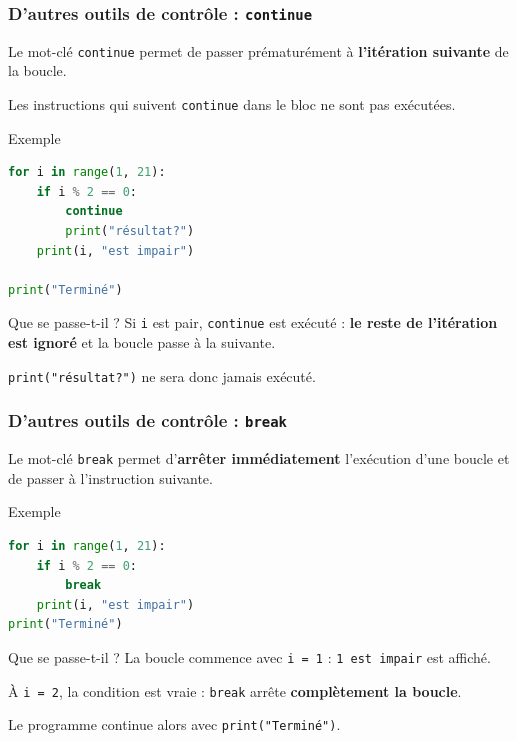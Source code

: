\documentclass[10pt]{beamer}
\begin{document}
\begin{frame}[containsverbatim]
	\frametitle{D'autres outils de contrôle : \texttt{continue}}
	

		Le mot-clé \texttt{continue} permet de passer prématurément
		à \textbf{l'itération suivante} de la boucle.
		
		Les instructions qui suivent \texttt{continue} dans le bloc
		ne sont pas exécutées.

	

	
	\begin{exampleblock}{Exemple}
\begin{lstlisting}[language=Python]
for i in range(1, 21):
	if i % 2 == 0:
		continue
		print("résultat?")
	print(i, "est impair")

print("Terminé")
		\end{lstlisting}
	\end{exampleblock}
	

	
	\begin{block}{Que se passe-t-il ?}
		Si \texttt{i} est pair, \texttt{continue} est exécuté :
		\textbf{le reste de l'itération est ignoré} et la boucle passe à la suivante.
		
		\centering
		\texttt{print("résultat?")} ne sera donc jamais exécuté.
	\end{block}
	
\end{frame}



\begin{frame}[containsverbatim]
	\frametitle{D'autres outils de contrôle : \texttt{break}}
	

		Le mot-clé \texttt{break} permet d'\textbf{arrêter immédiatement}
		l'exécution d'une boucle et de passer à l'instruction suivante.

	

	
	\begin{exampleblock}{Exemple}
		\begin{lstlisting}[language=Python]
for i in range(1, 21):
	if i % 2 == 0:
		break
	print(i, "est impair")
print("Terminé")
		\end{lstlisting}
	\end{exampleblock}
	
	\vspace{0.05cm}
	
	\begin{block}{Que se passe-t-il ?}
		La boucle commence avec \texttt{i = 1} :
		\texttt{1 est impair} est affiché.
		
		\vspace{0.05cm}
		
		À \texttt{i = 2}, la condition est vraie :
		\texttt{break} arrête \textbf{complètement la boucle}.
		
		\centering
		Le programme continue alors avec \texttt{print("Terminé")}.
	\end{block}
	
\end{frame}
\end{document}
